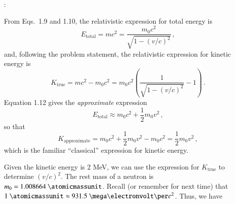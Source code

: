 \vspace{0.5cm}
\ifsolved
{
\color{purple}

:

From Eqs.~1.9 and 1.10, the relativistic expression for total energy is
\begin{equation*}
 E_{\text{total}} = mc^2 = \frac{m_0c^2}{\sqrt{1 - (v/c)^2}}  \, ,
\end{equation*}
and, following the problem statement, the relativistic expression for kinetic energy is
\begin{equation*}
  K_{\text{true}} = mc^2 -  m_0 c^2 = m_0 c^2 \left (\frac{1}{\sqrt{1 - (v/c)^2}} - 1 \right ) \, .
\end{equation*}
Equation 1.12 gives the {\it approximate} expression
\begin{equation*}
  E_{\text{total}} \approx  m_0 c^2 + \frac{1}{2} m_0v^2 \, ,
\end{equation*}
so that
\begin{equation*}
  K_{\text{approximate}} = m_0 c^2 + \frac{1}{2} m_0 v^2 -  m_0 c^2 = \frac{1}{2} m_0 v^2 \, ,
\end{equation*}
which is the familiar ``classical'' expression for kinetic energy.

Given the kinetic energy is 2 MeV, we can use the expression for $K_{\text{true}}$ to determine $(v/c)^2$.  The rest mass of a neutron is $m_0 = 1.008664~\atomicmassunit$.  Recall (or remember for next time) that $1~\atomicmassunit \approx 931.5~\mega\electronvolt\per c^2$.  Thus, we have

}
